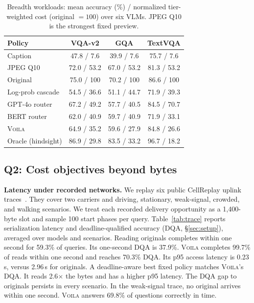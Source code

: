 \documentclass[10pt,conference]{IEEEtran}
\newcommand{\system}{\textsc{Voila}\xspace}
\newcommand{\tableformat}{\footnotesize\setlength{\tabcolsep}{3pt}\renewcommand{\arraystretch}{0.95}}
\begin{document}
\begin{table}[t]
\centering
\tableformat
\caption{Breadth workloads: mean accuracy (\%) / normalized tier-weighted cost
(original $=100$) over six VLMs. JPEG Q10 is the strongest fixed preview.}
\label{tab:breadth}
\begin{tabular}{lccc}
\toprule
Policy & VQA-v2 & GQA & TextVQA \\
\midrule
Caption            & 47.8 / 7.6  & 39.9 / 7.6  & 75.7 / 7.6 \\
JPEG Q10           & 72.0 / 53.2 & 67.0 / 53.2 & 81.3 / 53.2 \\
Original           & 75.0 / 100  & 70.2 / 100  & 86.6 / 100 \\
Log-prob cascade   & 54.5 / 36.6 & 51.1 / 44.7 & 71.9 / 39.3 \\
GPT-4o router      & 67.2 / 49.2 & 57.7 / 40.5 & 84.5 / 70.7 \\
BERT router        & 62.0 / 40.9 & 59.7 / 40.9 & 71.9 / 33.1 \\
\system            & 64.9 / 35.2 & 59.6 / 27.9 & 84.8 / 26.6 \\
\midrule
Oracle (hindsight) & 86.9 / 29.8 & 83.5 / 33.2 & 96.7 / 18.2 \\
\bottomrule
\end{tabular}
\end{table}

\subsection{Q2: Cost objectives beyond bytes}
\label{sec:objectives}

\textbf{Latency under recorded networks.} We replay six public CellReplay
uplink traces~\cite{cellreplay-nsdi25}. They cover two carriers and driving,
stationary, weak-signal, crowded, and walking scenarios. We treat each recorded
delivery opportunity as a 1,400-byte slot and sample 100 start phases per
query. Table~\ref{tab:trace} reports serialization latency and deadline-qualified
accuracy (DQA, \S\ref{sec:setup}), averaged
over models and scenarios. Reading originals completes within one second for
59.3\% of queries. Its one-second DQA is 37.9\%. \system completes 99.7\% of
reads within one second and reaches 70.3\% DQA. Its p95 access latency is
0.23\,s, versus 2.96\,s for originals. A deadline-aware best fixed policy
matches \system's DQA. It reads 2.6$\times$ the bytes and has a higher p95
latency. The DQA gap to originals persists in every scenario. In the
weak-signal trace, no original arrives within one second. \system answers
69.8\% of questions correctly in time.
\end{document}
